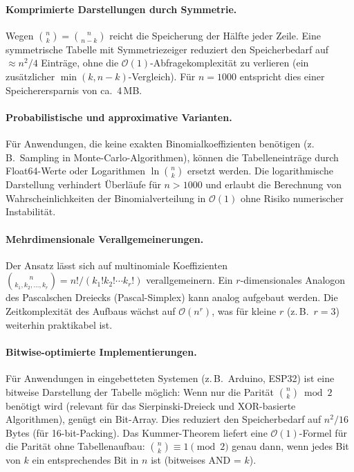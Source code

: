 ﻿\documentclass[12pt, a4paper]{article}
\newcommand{\Oh}{\mathcal{O}}
\theoremstyle{plain}
\theoremstyle{definition}
\theoremstyle{remark}
\renewcommand{\Oh}{\mathcal{O}}
\begin{document}
\paragraph{Komprimierte Darstellungen durch Symmetrie.}
Wegen $\binom{n}{k} = \binom{n}{n-k}$ reicht die Speicherung der
Hälfte jeder Zeile. Eine symmetrische Tabelle mit Symmetriezeiger
reduziert den Speicherbedarf auf $\approx n^2/4$ Einträge, ohne die
$\Oh(1)$-Abfragekomplexität zu verlieren (ein zusätzlicher
$\min(k, n-k)$-Vergleich). Für $n = 1000$ entspricht dies einer
Speicherersparnis von ca.\ 4\,MB.

\paragraph{Probabilistische und approximative Varianten.}
Für Anwendungen, die keine exakten Binomialkoeffizienten benötigen
(z.\,B.\ Sampling in Monte-Carlo-Algorithmen), können die
Tabelleneinträge durch Float64-Werte oder Logarithmen $\ln\binom{n}{k}$
ersetzt werden. Die logarithmische Darstellung verhindert Überläufe für
$n > 1000$ und erlaubt die Berechnung von Wahrscheinlichkeiten der
Binomialverteilung in $\Oh(1)$ ohne Risiko numerischer Instabilität.

\paragraph{Mehrdimensionale Verallgemeinerungen.}
Der Ansatz lässt sich auf multinomiale Koeffizienten
$\binom{n}{k_1, k_2, \ldots, k_r} = n! / (k_1! k_2! \cdots k_r!)$
verallgemeinern. Ein $r$-dimensionales Analogon des Pascalschen
Dreiecks (Pascal-Simplex) kann analog aufgebaut werden. Die
Zeitkomplexität des Aufbaus wächst auf $\Oh(n^r)$, was für kleine
$r$ (z.\,B.\ $r = 3$) weiterhin praktikabel ist.

\paragraph{Bitwise-optimierte Implementierungen.}
Für Anwendungen in eingebetteten Systemen (z.\,B.\ Arduino, ESP32)
ist eine bitweise Darstellung der Tabelle möglich: Wenn nur die
Parität $\binom{n}{k} \bmod 2$ benötigt wird (relevant für das
Sierpinski-Dreieck und XOR-basierte Algorithmen), genügt ein
Bit-Array. Dies reduziert den Speicherbedarf auf $n^2/16$ Bytes
(für 16-bit-Packing). Das Kummer-Theorem liefert eine
$\Oh(1)$-Formel für die Parität ohne Tabellenaufbau:
$\binom{n}{k} \equiv 1 \pmod{2}$ genau dann, wenn jedes Bit von $k$
ein entsprechendes Bit in $n$ ist (bitweises AND = $k$).
\end{document}

